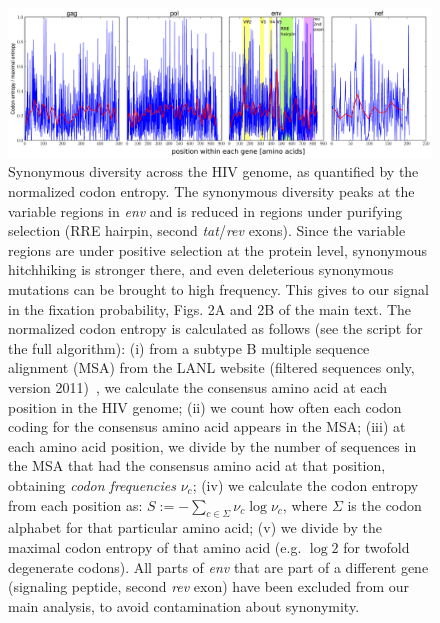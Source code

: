 \documentclass[rmp]{revtex4}
\begin{document}
\begin{figure}[h]
\begin{center}
\includegraphics[width=\linewidth]{conservation_codons_genome}
\caption{Synonymous diversity across the HIV genome, as quantified by the
normalized codon entropy. The synonymous diversity peaks at the variable
regions in {\it env} and is reduced in regions under purifying selection (RRE
hairpin, second {\it tat}/{\it rev} exons). Since the variable regions are under
positive selection at the protein level, synonymous hitchhiking is stronger
there, and even deleterious synonymous mutations can be brought to high
frequency. This gives to our signal in the fixation probability, Figs. 2A and
2B of the main text.
The normalized codon entropy is calculated as follows (see the script
for the full algorithm): (i) from a subtype B multiple sequence alignment
(MSA) from the LANL website (filtered sequences only, version 2011)~\cite{LANL2012},
we calculate the consensus amino acid at each position in the HIV genome; (ii) we count
how often each codon coding for the consensus amino acid appears in the MSA;
(iii) at each amino acid position, we divide by the number of sequences in the
MSA that had the consensus amino acid at that position, obtaining {\it codon
frequencies} $\nu_c$; (iv) we calculate the codon entropy from each position as:
$S := - \sum_{c \in \Sigma} \nu_c \log \nu_c$, where $\Sigma$ is the codon
alphabet for that particular amino acid; (v) we divide by the maximal codon entropy of
that amino acid (e.g. $\log 2$ for twofold degenerate codons).
All parts of {\it env} that are part of a different gene (signaling peptide,
second {\it rev} exon) have been excluded from our main analysis, to avoid
contamination about synonymity.}
\label{fig:syndiv_genome}
\end{center}
\end{figure}

\end{document}
